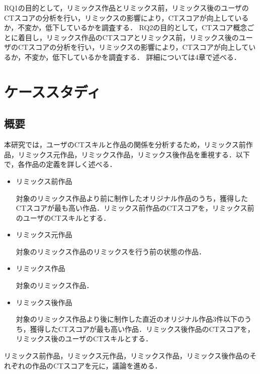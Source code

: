 \documentclass[11pt]{jreport}
\begin{document}
RQ1の目的として，リミックス作品とリミックス前，リミックス後のユーザのCTスコアの分析を行い，リミックスの影響により，CTスコアが向上しているか，不変か，低下しているかを調査する．
RQ2の目的として，CTスコア概念ごとに着目し，リミックス作品のCTスコアとリミックス前，リミックス後のユーザのCTスコアの分析を行い，リミックスの影響により，CTスコアが向上しているか，不変か，低下しているかを調査する．
詳細については4章で述べる．

\chapter{ケーススタディ}

\section{概要}
本研究では，ユーザのCTスキルと作品の関係を分析するため，リミックス前作品，リミックス元作品，リミックス作品，リミックス後作品を重視する．以下で，各作品の定義を詳しく述べる．
\begin{itemize}
  \item リミックス前作品
  
  対象のリミックス作品より前に制作したオリジナル作品のうち，獲得したCTスコアが最も高い作品．リミックス前作品のCTスコアを，リミックス前のユーザのCTスキルとする．
  
  \item リミックス元作品
  
  対象のリミックス作品のリミックスを行う前の状態の作品．
  
  \item リミックス作品
  
  対象のリミックス作品．

  \item リミックス後作品
  
  対象のリミックス作品より後に制作した直近のオリジナル作品3件以下のうち，獲得したCTスコアが最も高い作品．リミックス後作品のCTスコアを，リミックス後のユーザのCTスキルとする．
  
\end{itemize}
リミックス前作品，リミックス元作品，リミックス作品，リミックス後作品のそれぞれの作品のCTスコアを元に，議論を進める．
\end{document}
